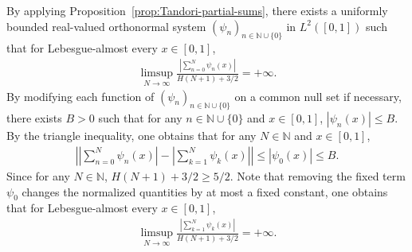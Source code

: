 \documentclass[12pt,reqno]{amsart}
\theoremstyle{definition}
\theoremstyle{plain}
\begin{document}
By applying Proposition~\ref{prop:Tandori-partial-sums}, there exists a uniformly bounded real-valued orthonormal system $(\psi_n)_{n\in\mathbb{N}\cup\{0\}}$ in $L^2([0,1])$ such that for Lebesgue-almost every $x\in[0,1]$,
\begin{align*}
    \limsup_{N\to\infty}
    \frac{
        \left|\sum_{n=0}^{N}\psi_n(x)\right|
    }{
        H(N+1)+3/2
    }
    =+\infty.
\end{align*}
By modifying each function of $(\psi_n)_{n\in\mathbb{N}\cup\{0\}}$ on a common null set if necessary, there exists $B>0$ such that for any $n\in\mathbb{N}\cup\{0\}$ and $x\in[0,1]$, $|\psi_n(x)|\leq B$. By the triangle inequality, one obtains that for any $N\in \mathbb{N}$ and $x\in[0,1]$,
\begin{align*}
    \left|
        \left|\sum_{n=0}^{N}\psi_n(x)\right|
        -
        \left|\sum_{k=1}^{N}\psi_k(x)\right|
    \right|
    \leq
    |\psi_0(x)|
    \leq B.
\end{align*}
Since for any $N\in\mathbb{N}$, $H(N+1)+3/2\geq5/2$. Note that removing the fixed term$\psi_0$ changes the normalized quantities by at most a fixed constant, one obtains that for Lebesgue-almost every $x\in[0,1]$,
\begin{align}
\label{eq:unweighted-divergence}
    \limsup_{N\to\infty}
    \frac{
        \left|\sum_{k=1}^{N}\psi_k(x)\right|
    }{
        H(N+1)+3/2
    }
    =+\infty.
\end{align}
\end{document}
